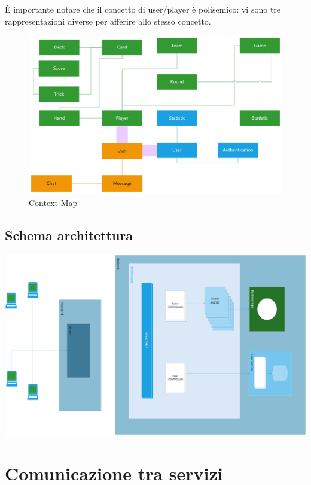 È importante notare che il concetto di user/player è polisemico: vi sono tre rappresentazioni diverse per afferire allo stesso concetto.
\begin{figure}[h!]
    \centering 
    \includegraphics[scale=0.75]{report/img/BoundedCTX.png}
    \caption{Context Map}
    \label{bounded_context}
\end{figure}
\newpage


\subsection{Schema architettura}

\includegraphics[width=16cm]{report/img/Architecture.png}\\[8.5cm]


\newpage
\section{Comunicazione tra servizi}


